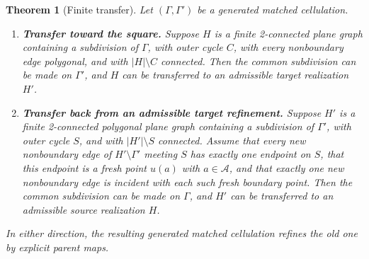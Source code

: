 \documentclass[11pt]{article}
\theoremstyle{mainplain}
\theoremstyle{mainroman}
\newtheorem{longtheorem}[theorem]{Theorem}
\theoremstyle{definition}
\newcommand{\alphlabels}{\renewcommand{\labelenumi}{\textup{(\alph{enumi})}}%
  \renewcommand{\theenumi}{\alph{enumi}}}
\numberwithin{equation}{section}
\begin{document}
\begin{longtheorem}[Finite transfer]\label{thm:finite-transfer}
Let $(\Gamma,\Gamma')$ be a generated matched cellulation.
\begin{enumerate}\alphlabels
\item \textbf{Transfer toward the square.}
Suppose $H$ is a finite 2-connected plane graph containing a
subdivision of $\Gamma$, with outer cycle $C$, with every nonboundary
edge polygonal, and with $|H|\setminus C$ connected. Then the common
subdivision can be made on $\Gamma'$, and $H$ can be transferred to an
admissible target realization $H'$.

\item \textbf{Transfer back from an admissible target refinement.}
Suppose $H'$ is a finite 2-connected polygonal plane graph containing
a subdivision of $\Gamma'$, with outer cycle $S$, and with
$|H'|\setminus S$ connected. Assume that every new nonboundary edge of
$H'\setminus\Gamma'$ meeting $S$ has exactly one endpoint on $S$, that
this endpoint is a fresh point
$u(a)$ with $a\in\mathcal A$, and that exactly one new nonboundary edge is
incident with each such fresh boundary point. Then the common
subdivision can be made on $\Gamma$, and $H'$ can be transferred to an
admissible source realization $H$.
\end{enumerate}
In either direction, the resulting generated matched cellulation refines the old
one by explicit parent maps.
\end{longtheorem}
\end{document}
